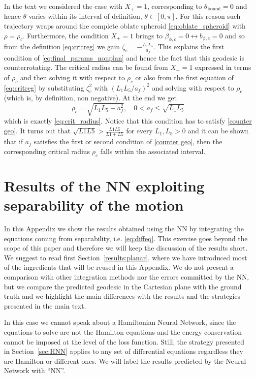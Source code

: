 \documentclass[prd,aps,a4paper,eqsecnum,nofootinbib,floatfix,twocolumn,superscriptaddress]{revtex4-2}
\renewcommand{\quote}[1]{``#1''}
\begin{document}
In the text we considered the case with $X_+ = 1$, corresponding to $\theta_{\text{bound}}=0$ and hence $\theta$ varies within its interval of definition, $\theta \in [0,\pi]$. For this reason such trajectory wraps around the complete oblate spheroid \eqref{eq:oblate_spheroid} with $\rho = \rho_c$. Furthermore, the condition $X_+ = 1$ brings to $\beta_{\phi,c} = 0 \leftrightarrow b_{\phi,c} = 0$ and so from the definition \eqref{eq:critreg} we gain $\zeta_c = - \frac{L_1 L_5}{a_f}$. This explains the first condition of \eqref{eq:final_params_nonplan} and hence the fact that this geodesic is counterrotating. The critical radius can be found from $X_+ = 1$ expressed in terms of $\rho_c$ and then solving it with respect to $\rho_c$ or also from the first equation of \eqref{eq:critreg} by substituting $\zeta^2_c$ with $(L_1 L_5/a_f)^2$ and solving with respect to $\rho_c$ (which is, by definition, non negative). At the end we get
\begin{equation}
\rho_c=\sqrt{L_1L_5-a_f^2},\quad 0<a_f\leq \sqrt{L_1L_5}
\end{equation}
which is exactly \eqref{eq:crit_radius}. Notice that this condition has to satisfy \eqref{counter geo}. It turns out that $\sqrt{L1 L5} > \frac{L1 L5}{L1+L5}$ for every $L_1,L_5 >0$ and it can be shown that if $a_f$ satisfies the first or second condition of \eqref{counter geo}, then the corresponding critical radius $\rho_c$ falls within the associated interval.

\section{\label{APP:PINN_separability} Results of the NN exploiting separability of the motion}


In this Appendix we show the results obtained using the NN by integrating the equations coming from separability, i.e. \eqref{eq:diffeq}. This exercise goes beyond the scope of this paper 
and therefore we will keep the discussion of the results short. We suggest to read first Section~\ref{results:planar}, where we have introduced most of the ingredients that will be reused in this Appendix. We do not present a comparison with other integration methods nor the errors committed by the NN, but we compare the predicted geodesic in the Cartesian plane with the ground truth and we highlight the main differences with the results and the strategies presented in the main text.

In this case we cannot speak about a Hamiltonian Neural Network, since the equations to solve are not the Hamilton equations and the energy conservation cannot be imposed at the level of the loss function. Still, the strategy presented in Section~\ref{sec:HNN} applies to any set of differential equations regardless they are Hamilton or different ones. We will label the results predicted by the Neural Network with \quote{NN}. 
\end{document}
